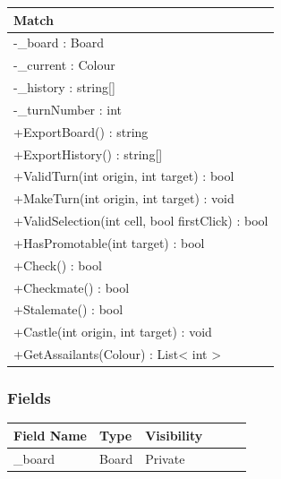 \documentclass[12pt]{article}
\begin{document}
\begin{table}[H]
    \begin{tabular}{|l|}
    \hline
    \rowcolor[HTML]{C0C0C0} 
    \textbf{Match}                                    \\ \hline
    \rowcolor[HTML]{EFEFEF} 
    -\_board : Board                                  \\ \hline
    \rowcolor[HTML]{EFEFEF} 
    -\_current : Colour                               \\ \hline
    \rowcolor[HTML]{EFEFEF} 
    -\_history : string{[}{]}                         \\ \hline
    \rowcolor[HTML]{EFEFEF} 
    -\_turnNumber : int                               \\ \hline
    +ExportBoard() : string                           \\ \hline
    +ExportHistory() : string[]                       \\ \hline
    +ValidTurn(int origin, int target) : bool         \\ \hline
    +MakeTurn(int origin, int target) : void          \\ \hline
    +ValidSelection(int cell, bool firstClick) : bool \\ \hline
    +HasPromotable(int target) : bool                 \\ \hline
    +Check() : bool                                   \\ \hline
    +Checkmate() : bool                               \\ \hline
    +Stalemate() : bool                               \\ \hline
    +Castle(int origin, int target) : void            \\ \hline
    +GetAssailants(Colour) : List\textless{} int \textgreater{}                \\ \hline
\end{tabular}
\end{table}

\subsubsection{Fields}

\begin{table}[H]
    \begin{tabular}{llllll}
    \hline
    \multicolumn{1}{|l|}{\cellcolor[HTML]{EFEFEF}\textbf{Field Name}} & \multicolumn{1}{l|}{\cellcolor[HTML]{EFEFEF}\textbf{Type}} & \multicolumn{1}{l|}{\cellcolor[HTML]{EFEFEF}\textbf{Visibility}} \\ \hline
    \multicolumn{1}{|l|}{\_board}                                     & \multicolumn{1}{l|}{Board}                                 & \multicolumn{1}{l|}{Private}                                     \\ \hline
    \end{tabular}
\end{table}
\end{document}
